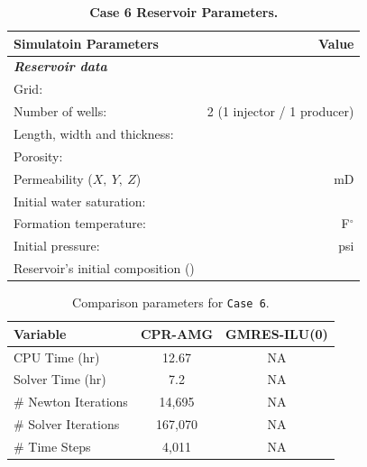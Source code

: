 \FloatBarrier
\begin{center}
\begin{table}[h!]
\begin{adjustbox}{width=0.5\textwidth}
    \begin{threeparttable}
    \caption{\textbf{Case 6 Reservoir Parameters.}}
    \label{viscous}
        \begin{tabular}{l r }
            \toprule
            Simulatoin Parameters & Value\\
            \midrule
	\rowcolor{red!20}\textit{\textbf{Reservoir data}}      & \\
	Grid:      &            \\
	\rowcolor{blue!5}Number of wells:      &  2 (1 injector / 1 producer) \\
	Length, width and thickness:      & \\
	\rowcolor{blue!5}Porosity:       &           \\
	Permeability ($X, \ Y, \ Z$) &  mD\\
	\rowcolor{blue!5}Initial water saturation:    &  \\      
	Formation temperature:    &  F$^{\circ}$     \\
	\rowcolor{blue!5}Initial pressure:    &       psi\\
	Reservoir’s initial composition () & \\
        \bottomrule
        \end{tabular}
    \end{threeparttable}
\end{adjustbox}    
\end{table}
\end{center}
\FloatBarrier

\begin{table}[h!]
   \caption{Comparison parameters for \texttt{Case 6}.}
   \label{case6-tab}
   \small
   \centering
   \begin{tabular}{lcc}
   \toprule\toprule
   \textbf{Variable} & \textbf{CPR-AMG} & \textbf{GMRES-ILU(0)} \\
   \midrule
   CPU Time (hr) & 12.67 &  NA \\
   Solver Time (hr) & 7.2  & NA \\
   \# Newton Iterations & 14,695 & NA\\
   \# Solver Iterations & 167,070 & NA \\
   \# Time Steps & 4,011& NA \\
   \bottomrule
   \end{tabular}
\end{table}

